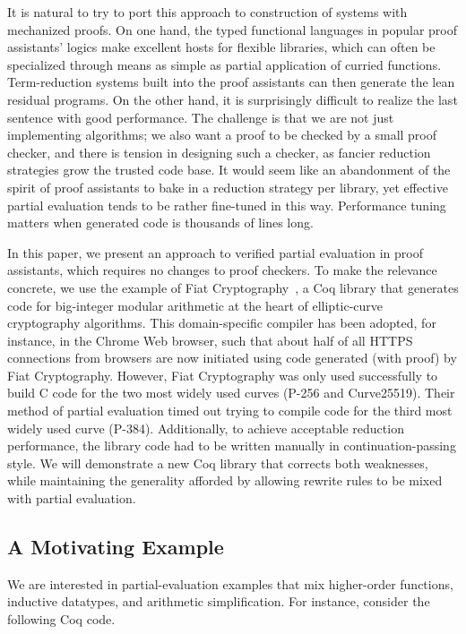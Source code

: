 \documentclass[sigplan,10pt,review,anonymous]{acmart}\settopmatter{printfolios=true,printccs=false,printacmref=false}
\begin{document}
It is natural to try to port this approach to construction of systems with mechanized proofs.
On one hand, the typed functional languages in popular proof assistants' logics make excellent hosts for flexible libraries, which can often be specialized through means as simple as partial application of curried functions.
Term-reduction systems built into the proof assistants can then generate the lean residual programs.
On the other hand, it is surprisingly difficult to realize the last sentence with good performance.
The challenge is that we are not just implementing algorithms; we also want a proof to be checked by a small proof checker, and there is tension in designing such a checker, as fancier reduction strategies grow the trusted code base.
It would seem like an abandonment of the spirit of proof assistants to bake in a reduction strategy per library, yet effective partial evaluation tends to be rather fine-tuned in this way.
Performance tuning matters when generated code is thousands of lines long.

In this paper, we present an approach to verified partial evaluation in proof assistants, which requires no changes to proof checkers.
To make the relevance concrete, we use the example of Fiat Cryptography~\cite{FiatCryptoSP19}, a Coq library that generates code for big-integer modular arithmetic at the heart of elliptic-curve cryptography algorithms.
This domain-specific compiler has been adopted, for instance, in the Chrome Web browser, such that about half of all HTTPS connections from browsers are now initiated using code generated (with proof) by Fiat Cryptography.
However, Fiat Cryptography was only used successfully to build C code for the two most widely used curves (P-256 and Curve25519).
Their method of partial evaluation timed out trying to compile code for the third most widely used curve (P-384).
Additionally, to achieve acceptable reduction performance, the library code had to be written manually in continuation-passing style.
We will demonstrate a new Coq library that corrects both weaknesses, while maintaining the generality afforded by allowing rewrite rules to be mixed with partial evaluation.

\subsection{A Motivating Example} \label{sec:motivating-example} \label{sec:explain-ident.eagerly} \label{sec:explain-eval-rect} \label{sec:explain-'}

We are interested in partial-evaluation examples that mix higher-order functions, inductive datatypes, and arithmetic simplification.
For instance, consider the following Coq code.
\end{document}
